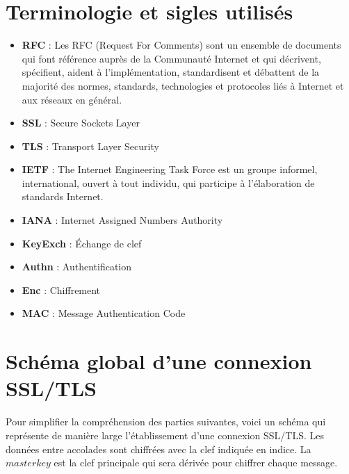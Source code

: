 \documentclass[a4paper,11pt,french]{article}
\begin{document}
\section{Terminologie et sigles utilisés}
\begin{itemize}
	\item \textbf{RFC} : Les RFC (Request For Comments) sont un ensemble de documents qui font référence auprès de la Communauté Internet et qui décrivent, spécifient, aident à l'implémentation, standardisent et débattent de la majorité des normes, standards, technologies et protocoles liés à Internet et aux réseaux en général. 
    \item \textbf{SSL} : Secure Sockets Layer
    \item \textbf{TLS} : Transport Layer Security 
    \item \textbf{IETF} : The Internet Engineering Task Force est un groupe informel, international, ouvert à tout individu, qui participe à l'élaboration de standards Internet.
    \item \textbf{IANA} : Internet Assigned Numbers Authority
    \item \textbf{KeyExch} : Échange de clef
    \item \textbf{Authn} : Authentification
    \item \textbf{Enc} : Chiffrement
    \item \textbf{MAC} :  Message Authentication Code
\end{itemize}

\pagebreak
\section{Schéma global d'une connexion SSL/TLS}
Pour simplifier la compréhension des parties suivantes, voici un schéma qui représente de manière large l'établissement d'une connexion SSL/TLS. Les données entre accolades sont chiffrées avec la clef indiquée en indice. La $masterkey$ est la clef principale qui sera dérivée pour chiffrer chaque message.
\end{document}
